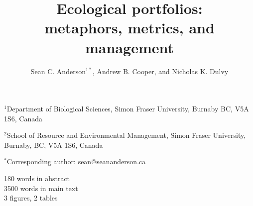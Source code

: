 \documentclass[11pt]{article}
\title{Ecological portfolios:\\metaphors, metrics, and management}
\author{Sean C. Anderson$^{1\ast}$,
  Andrew B. Cooper,
  and Nicholas K. Dulvy}
\date{}
\begin{document}

\maketitle
$^1$Department of Biological Sciences, Simon Fraser University, Burnaby BC, V5A
1S6, Canada

$^2$School of Resource and Environmental Management, Simon Fraser University,
Burnaby, BC, V5A 1S6, Canada

$^{\ast}$Corresponding author: sean@seananderson.ca


180 words in abstract\\
3500 words in main text\\
3 figures, 2 tables

\clearpage


\linenumbers
\modulolinenumbers[3]
\doublespacing


\clearpage

%
\clearpage

\clearpage

\clearpage


\end{document}
